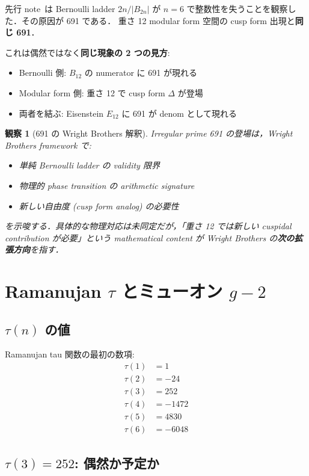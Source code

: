 \documentclass[11pt,a4paper]{article}
\newtheorem{observation}{観察}
\begin{document}
先行 note~\cite{b2-deeper}は Bernoulli ladder $2n/|B_{2n}|$ が
$n = 6$ で整数性を失うことを観察した．その原因が 691 である．
重さ 12 modular form 空間の cusp form 出現と\textbf{同じ 691}．

これは偶然ではなく\textbf{同じ現象の 2 つの見方}:
\begin{itemize}
\item Bernoulli 側: $B_{12}$ の numerator に 691 が現れる
\item Modular form 側: 重さ 12 で cusp form $\Delta$ が登場
\item 両者を結ぶ: Eisenstein $E_{12}$ に 691 が denom として現れる
\end{itemize}

\begin{observation}[691 の Wright Brothers 解釈]
Irregular prime 691 の登場は，Wright Brothers framework で:
\begin{itemize}
\item 単純 Bernoulli ladder の validity 限界
\item 物理的 phase transition の arithmetic signature
\item 新しい自由度 (cusp form analog) の必要性
\end{itemize}
を示唆する．具体的な物理対応は未同定だが，「重さ 12 では新しい
cuspidal contribution が必要」という mathematical content が Wright
Brothers の\textbf{次の拡張方向}を指す．
\end{observation}

\section{Ramanujan $\tau$ とミューオン $g-2$}

\subsection{$\tau(n)$ の値}

Ramanujan tau 関数の最初の数項:
\begin{align}
\tau(1) &= 1\\
\tau(2) &= -24\\
\tau(3) &= 252\\
\tau(4) &= -1472\\
\tau(5) &= 4830\\
\tau(6) &= -6048
\end{align}

\subsection{$\tau(3) = 252$: 偶然か予定か}
\end{document}
